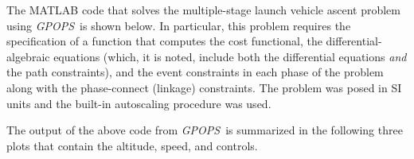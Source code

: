 \documentclass[10pt]{article}
\newcommand{\gpops}{{\em GPOPS}~}
\newenvironment{shadedframe}{%
  \def\FrameCommand{\fcolorbox{black}{shadecolor}}%
  \MakeFramed {\FrameRestore}}
{\endMakeFramed}
\begin{document}
The MATLAB code that solves the multiple-stage launch vehicle ascent
problem using \gpops is shown below.  In particular, this
problem requires the specification of a function that computes the
cost functional, the differential-algebraic equations (which, it is
noted, include both the differential equations {\em and} the path
constraints), and the event constraints in each phase of the problem
along with the phase-connect (\ie linkage) constraints.  The problem
was posed in SI units and the built-in autoscaling procedure was
used.
\scriptsize
\begin{shadedframe}






\end{shadedframe}
\normalsize
The output of the above code from \gpops is summarized in the following three
plots that contain the altitude, speed, and controls.
\end{document}
